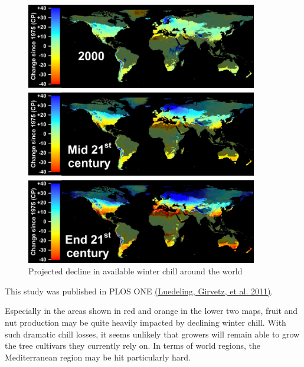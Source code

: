 \documentclass[
]{book}
\begin{document}
\begin{figure}
\centering
\includegraphics[width=0.9\textwidth,height=\textheight]{pictures/Figure_5_Time_Comp.jpg}
\caption{Projected decline in available winter chill around the world}
\end{figure}

This study was published in PLOS ONE \href{https://journals.plos.org/plosone/article?id=10.1371/journal.pone.0020155}{(Luedeling, Girvetz, et al. \protect\hyperlink{ref-luedeling2011climate}{2011})}.

Especially in the areas shown in red and orange in the lower two maps, fruit and nut production may be quite heavily impacted by declining winter chill. With such dramatic chill losses, it seems unlikely that growers will remain able to grow the tree cultivars they currently rely on. In terms of world regions, the Mediterranean region may be hit particularly hard.
\end{document}
